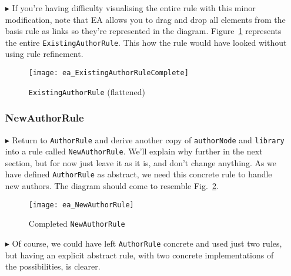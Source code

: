 \begin{itemize}
\item[$\blacktriangleright$] If you're having difficulty visualising the entire rule with this minor modification, note that EA allows you to drag and drop all
elements from the basis rule as links so they're represented in the diagram. Figure~\ref{ea:existingAuthorRuleComplete} represents the entire
\texttt{ExistingAuthorRule}. This how the rule would have looked without using rule refinement.

\vspace{0.5cm}

\begin{figure}[htbp]
\begin{center}
  \texttt{[image: ea\_ExistingAuthorRuleComplete]}
  \caption{\texttt{ExistingAuthorRule} (flattened)}
  \label{ea:existingAuthorRuleComplete}
\end{center}
\end{figure}

\vspace{-0.5cm}

\subsubsection{NewAuthorRule} %

\item[$\blacktriangleright$] Return to \texttt{AuthorRule} and derive another copy of \texttt{authorNode} and \texttt{library} into a rule called
\texttt{NewAuthorRule}. We'll explain why further in the next section, but for now just leave it as it is, and don't change anything. As we have defined
\texttt{AuthorRule} as abstract, we need this concrete rule to handle new authors. The diagram should come to resemble Fig.~\ref{ea:NewAuthorRule}.

\vspace{0.5cm}

\begin{figure}[htbp]
\begin{center}
  \texttt{[image: ea\_NewAuthorRule]}
  \caption{Completed \texttt{NewAuthorRule}}
  \label{ea:NewAuthorRule}
\end{center}
\end{figure}

\item[$\blacktriangleright$] Of course, we could have left \texttt{AuthorRule} concrete and used just two rules, but having an explicit abstract rule, with
two concrete implementations of the possibilities, is clearer.


\end{itemize}
